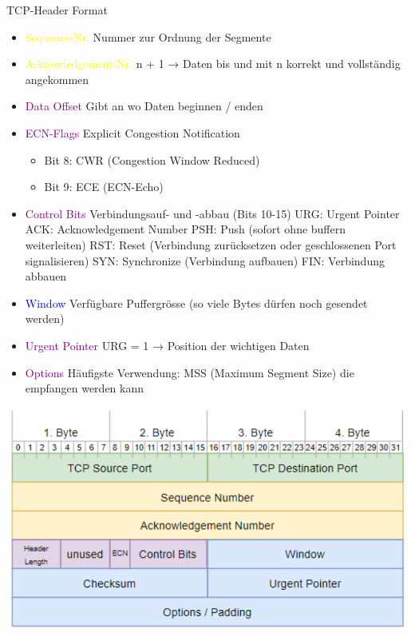 \begin{concept}{TCP-Header Format}
    \begin{itemize}
        \item \textcolor{yellow}{Sequence-Nr.} Nummer zur Ordnung der Segmente
        \item \textcolor{yellow}{Acknowledgement-Nr.} n + 1 → Daten bis und mit n korrekt und vollständig angekommen
        \item \textcolor{purple}{Data Offset} Gibt an wo Daten beginnen / enden
        \item \textcolor{purple}{ECN-Flags} Explicit Congestion Notification
        \begin{itemize}
            \item Bit 8: CWR (Congestion Window Reduced)
            \item Bit 9: ECE (ECN-Echo)
        \end{itemize}
        \item \textcolor{purple}{Control Bits} Verbindungsauf- und -abbau (Bits 10-15)
        URG: Urgent Pointer
        ACK: Acknowledgement Number
        PSH: Push (sofort ohne buffern weiterleiten)
        RST: Reset (Verbindung zurücksetzen oder geschlossenen Port signalisieren)
        SYN: Synchronize (Verbindung aufbauen)
        FIN: Verbindung abbauen
        \item \textcolor{blue}{Window} Verfügbare Puffergrösse (so viele Bytes dürfen noch gesendet werden)
        \item \textcolor{purple}{Urgent Pointer} URG = 1 → Position der wichtigen Daten
        \item \textcolor{purple}{Options} Häufigste Verwendung: MSS (Maximum Segment Size) die empfangen werden kann
    \end{itemize}
    \includegraphics[width=1\linewidth]{images/tcpheader.png}
\end{concept}

